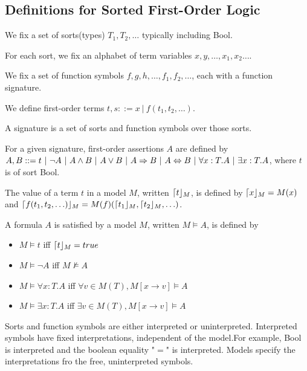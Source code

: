 \subsection{Definitions for Sorted First-Order Logic}
\begin{mytitle}[Sort] We fix a set of sorts(types) $T_1, T_2, \ldots$ typically including Bool.
\end{mytitle}
\begin{mytitle} For each sort, we fix an alphabet of term variables $x, y, \ldots, x_1, x_2 \ldots$.
\end{mytitle}
\begin{mytitle} We fix a set of function symbols $f, g, h, \ldots, f_1, f_2, \ldots$, each with a function signature.
\end{mytitle}
\begin{mytitle} We define first-order terms $t, s::= x\ |\ f(t_1, t_2,\ldots)$.
\end{mytitle}
\begin{mytitle}[Signature] A signature is a set of sorts and function symbols over those sorts.
\end{mytitle}
\begin{mytitle} For a given signature, first-order assertions $A$ are defined by $A, B ::= t\ |\ \lnot A\ |\ A\land B\ |\ A\lor B\ |\ A\To B\ |\ A\Leftrightarrow B\ |\ \forall x:T.A\ |\ \exists x: T.A$, where $t$ is of sort Bool. 
\end{mytitle}
\begin{mytitle} The value of a term $t$ in a model $M$, written $\lceil t\rfloor_{M}$, is defined by $\lceil x\rfloor_{M}=M(x)$ and $\lceil f(t_1, t_2, \ldots)\rfloor_{M}=M(f)(\lceil t_1\rfloor_{M}, \lceil t_2\rfloor_{M}, \ldots)$.
\end{mytitle}
\begin{mytitle}[Satisfaction] A formula $A$ is satisfied by a model $M$, written $M\models A$, is defined by 
\begin{itemize}
    \item $M\models t$ iff $\lceil t\rfloor_{M}=true$
    \item $M\models \lnot A$ iff $M\not\models A$
    \item $M\models \forall x: T.A$ iff $\forall v\in M(T), M[x \to v]\models A$
    \item $M\models \exists x: T.A$ iff $\exists v\in M(T), M[x \to v]\models A$
\end{itemize}
\end{mytitle}
\begin{mytitle}[Interpretation] Sorts and function symbols are either interpreted or uninterpreted. Interpreted symbols have fixed interpretations, independent of the model.For example, Bool is interpreted and the boolean equality "$=$" is interpreted. Models specify the interpretations fro the free, uninterpreted symbols.
\end{mytitle}

